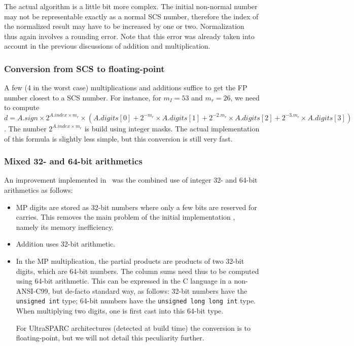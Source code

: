 The actual algorithm is a little bit more complex. The initial
non-normal number may not be representable exactly as a normal SCS
number, therefore the index of the normalized result may have to be
increased by one or two.  Normalization thus again involves a rounding
error. Note that this error was already taken into account in the previous
discussions of addition and multiplication.




\subsubsection{Conversion from SCS to floating-point}

A few (4 in the worst case) multiplications and additions suffice to
get the FP number closest to a SCS number.  For instance, for $m_I=53$
and $m_r=26$, we need to compute $d = A.sign \times 2^{A.index \times
  m_r} \times ( A.digits[0]+ 2^{-m_r} \times A.digits[1]+ 2^{-2.m_r}
\times A.digits[2]+ 2^{-3.m_r} \times A.digits[3])$. The number
$2^{A.index \times m_r}$ is build using integer masks. The actual
implementation of this formula is slightly less simple, but this
conversion is still very fast.


\subsubsection{Mixed 32- and 64-bit arithmetics}

An improvement implemented in \scslib\ was the combined use of integer 32- and 64-bit
arithmetics as follows: 

\begin{itemize}
\item MP digits are stored as 32-bit numbers where only a few bits are
  reserved for carries. This removes the main problem of the initial
implementation \cite{Dinechin2002b}, namely its memory inefficiency.

\item Addition uses 32-bit arithmetic. 

\item In the MP multiplication, the partial products are products of
  two 32-bit digits, which are 64-bit numbers. The column sums need
  thus to be computed using 64-bit arithmetic. This can be expressed
  in the C language in a non-ANSI-C99, but de-facto standard way, as
  follows: 32-bit numbers have the \texttt{unsigned int} type; 64-bit
  numbers have the \texttt{unsigned long long int} type. When
  multiplying two digits, one is first cast into this 64-bit type.
  
  For UltraSPARC architectures (detected at build time) the
  conversion is to floating-point, but we will not detail this
  peculiarity further.
\end{itemize}


